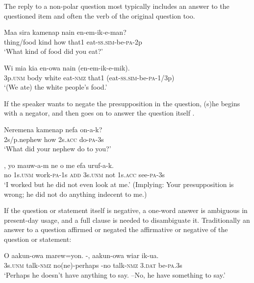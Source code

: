 The reply to a non-polar question most typically includes an answer to the questioned item and often the verb of the original question too.

\ea%
\label{ex:7:x1221}
\gll Maa  sira  kamenap  nain  en-em-ik-e-man? \\
thing/food  kind  how  that1  eat-\textsc{ss}.\textsc{sim}-be-\textsc{pa}-2p      \\
\glt `What kind of food did you eat?'
\z





\ea%
\label{ex:7:x1222}
\gll Wi  mia  kia  en-owa  nain  (en-em-ik-e-mik). \\
3p.\textsc{unm}  body  white  eat-\textsc{nmz}  that1  (eat-\textsc{ss}.\textsc{sim}-be-\textsc{pa}-1/3p)      \\
\glt `(We ate) the white people's food.'
\z





If the speaker wants to negate the presupposition in the question, (s)he begins with a negator, and then goes on to answer the question itself .

\ea%
\label{ex:7:x1223}
\gll Neremena  kamenap  nefa  on-a-k? \\
2s/p.nephew  how  2s.\textsc{acc}  do-\textsc{pa}-3s      \\
\glt `What did your nephew do to you?'
\z





\ea%
\label{ex:7:x1224}
\gll {},  yo  mauw-a-m  ne  o  me  efa  uruf-a-k.\\
no  1s.\textsc{unm}  work-\textsc{pa}-1s  \textsc{add}  3s.\textsc{unm}  not  1s.\textsc{acc}  see-\textsc{pa}-3s     \\
\glt `I worked but he did not even look at me.' (Implying: Your presupposition is wrong; he did not do anything indecent to me.)
\z

 
If the question or statement itself is negative, a one-word answer is ambiguous in present-day usage, and a full clause is needed to disambiguate it. Traditionally an answer to a question affirmed or negated the affirmative or negative  of the question or statement:

\ea%
\label{ex:7:x1151}
\gll O  aakun-owa  marew=yon.  -,  aakun-owa  wiar  ik-ua.\\
3s.\textsc{unm}  talk-\textsc{nmz}  no(ne)-perhaps  -no  talk-\textsc{nmz}  3.\textsc{dat} be-\textsc{pa}.3s     \\
\glt `Perhaps he doesn't have anything to say. --No, he  have something to say.'
\z









